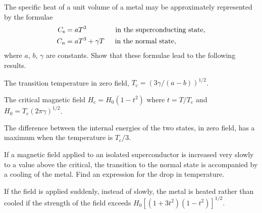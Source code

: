 \bigskip{}
The specific heat of a unit volume of a metal
may be approximately represented by the formulae
\begin{align*}
C_\text{s} &= a T^3 \phantom{+ \gamma T}\qquad \text{in the superconducting state},\\
C_\text{n} &= a T^3 + \gamma T \qquad \hskip-5pt\text{in the normal state},
\end{align*}
where $a$, $b$, $\gamma$ are constants.
Show that these formulae lead to the following results.

\smallskip\subp
The transition temperature in zero field, $T_\text{c} = (3\gamma/(a-b))^{1/2}$.

\smallskip\subp
The critical magnetic field $H_\text{c} = H_0(1-t^2)$
where $t=T/T_\text{c}$ and $H_0=T_\text{c}(2\pi\gamma)^{1/2}$.

\smallskip\subp
The difference between the internal energies of the two states,
in zero field, has a maximum when the temperature is $T_\text{c}/3$.

\smallskip\subp
If a magnetic field applied to an isolated superconductor
is increased very slowly to a value above the critical,
the transition to the normal state is accompanied by a cooling of the metal.
Find an expression for the drop in temperature.

\smallskip\subp
If the field is applied suddenly, instead of slowly,
the metal is heated rather than cooled if the strength of the field exceeds
$ H_0 [ (1+3t^2) (1-t^2) ]^{1/2} $.

